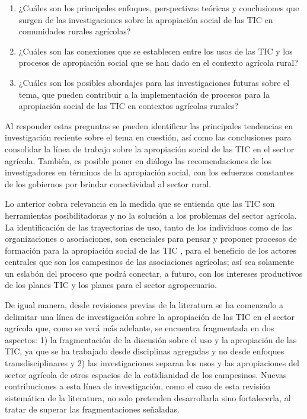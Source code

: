 \documentclass[spanish]{textolivre}
\begin{document}
\begin{enumerate}
    \item ¿Cuáles son los principales enfoques, perspectivas teóricas y conclusiones que surgen de las investigaciones sobre la apropiación social de las TIC en comunidades rurales agrícolas?
    \item 	¿Cuáles son las conexiones que se establecen entre los usos de las TIC y los procesos de apropiación social que se han dado en el contexto agrícola rural?
    \item ¿Cuáles son los posibles abordajes para las investigaciones futuras sobre el tema, que pueden contribuir a la implementación de procesos para la apropiación social de las TIC en contextos agrícolas rurales?
\end{enumerate}

Al responder estas preguntas se pueden identificar las principales tendencias en investigación reciente sobre el tema en cuestión, así como las conclusiones para consolidar la línea de trabajo sobre la apropiación social de las TIC en el sector agrícola. También, es posible poner en diálogo las recomendaciones de los investigadores en términos de la apropiación social, con los esfuerzos constantes de los gobiernos por brindar conectividad al sector rural. 

Lo anterior cobra relevancia en la medida que se entienda que las TIC son herramientas posibilitadoras y no la solución a los problemas del sector agrícola. La identificación de las trayectorias de uso, tanto de los individuos como de las organizaciones o asociaciones, son esenciales para pensar y proponer procesos de formación para la apropiación social de las TIC \cite{crovi_drueta_dimension_2008}, para el beneficio de los actores centrales que son los campesinos de las asociaciones agrícolas; así sea solamente un eslabón del proceso que podrá conectar, a futuro, con los intereses productivos de los planes TIC y los planes para el sector agropecuario.

De igual manera, desde revisiones previas de la literatura se ha comenzado a delimitar una línea de investigación sobre la apropiación de las TIC en el sector agrícola que, como se verá más adelante, se encuentra fragmentada en dos aspectos: 1) la fragmentación de la discusión sobre el uso y la apropiación de las TIC, ya que se ha trabajado desde disciplinas agregadas y no desde enfoques transdisciplinares y 2) las investigaciones separan los usos y las apropiaciones del sector agrícola de otros espacios de la cotidianidad de los campesinos. Nuevas contribuciones a esta línea de investigación, como el caso de esta revisión sistemática de la literatura, no solo pretenden desarrollarla sino fortalecerla, al tratar de superar las fragmentaciones señaladas.
\end{document}

